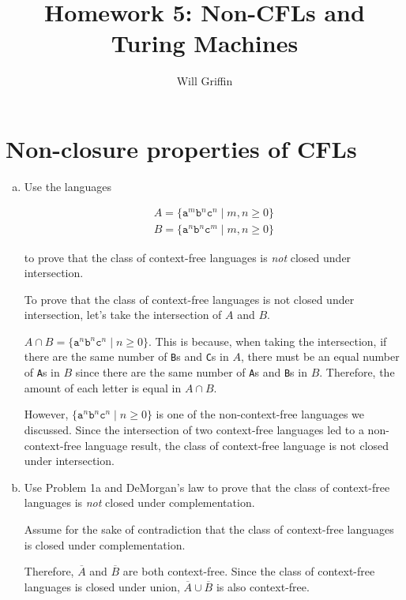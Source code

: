 \documentclass{article}
\title{Homework 5: Non-CFLs and Turing Machines}
\author{Will Griffin}
\begin{document}
    \maketitle

    \section{Non-closure properties of CFLs}

    \begin{enumerate}[(a)]
        \item Use the languages

            \begin{align*}
                A = \{\texttt{a}^m \texttt{b}^n \texttt{c}^n \mid m, n \ge 0\} \\
                B = \{\texttt{a}^n \texttt{b}^n \texttt{c}^m \mid m, n \ge 0\}
            \end{align*}

            to prove that the class of context-free languages is \textit{not} closed under intersection.

            To prove that the class of context-free languages is not closed under intersection, let's take the intersection of $A$ and $B$.

            $A \cap B = \{\texttt{a}^n \texttt{b}^n \texttt{c}^n \mid n \ge 0\}$. This is because, when taking the intersection, if there are the same number of \texttt{B}s and \texttt{C}s in $A$, there must be an equal number of \texttt{A}s in $B$ since there are the same number of \texttt{A}s and \texttt{B}s in $B$. Therefore, the amount of each letter is equal in $A \cap B$. 

            However, $\{\texttt{a}^n \texttt{b}^n \texttt{c}^n \mid n \ge 0\}$ is one of the non-context-free languages we discussed. Since the intersection of two context-free languages led to a non-context-free language result, the class of context-free language is not closed under intersection.

        \item Use Problem 1a and DeMorgan's law to prove that the class of context-free languages is \textit{not} closed under complementation.

            Assume for the sake of contradiction that the class of context-free languages is closed under complementation. 

            Therefore, $\overline{A}$ and $\overline{B}$ are both context-free. Since the class of context-free languages is closed under union, $\overline{A} \cup \overline{B}$ is also context-free.


\end{enumerate}
\end{document}
